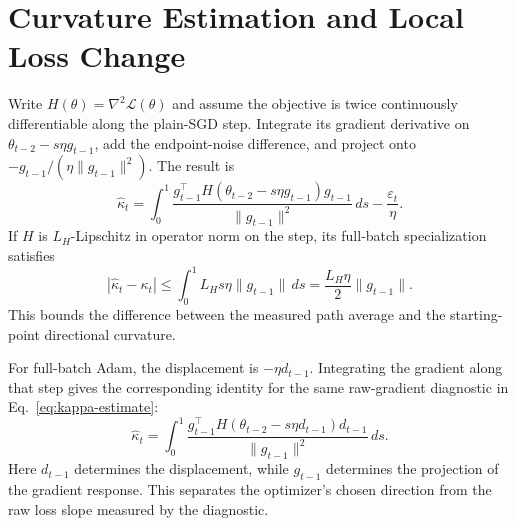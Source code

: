 \section{Curvature Estimation and Local Loss Change}
\label{appendix:loss-curvature}

Write $H(\theta)=\nabla^2\mathcal L(\theta)$ and assume the objective
is twice continuously differentiable along the plain-SGD step.
Integrate its gradient derivative on
$\theta_{t-2}-s\eta g_{t-1}$, add the endpoint-noise difference, and
project onto $-g_{t-1}/(\eta\|g_{t-1}\|^2)$. The result is
\begin{equation}
 \widehat\kappa_t=
 \int_0^1\frac{g_{t-1}^{\top}
 H(\theta_{t-2}-s\eta g_{t-1})g_{t-1}}
 {\|g_{t-1}\|^2}\,ds-\frac{\varepsilon_t}{\eta}.
 \label{eq:path-curvature}
\end{equation}
If $H$ is $L_H$-Lipschitz in operator norm on the step, its
full-batch specialization satisfies
\begin{equation}
 |\widehat\kappa_t-\kappa_t|
 \leq\int_0^1 L_Hs\eta\|g_{t-1}\|\,ds
 =\frac{L_H\eta}{2}\|g_{t-1}\|.
 \label{eq:curvature-error-bound}
\end{equation}
This bounds the difference between the measured path average and the
starting-point directional curvature.

For full-batch Adam, the displacement is $-\eta d_{t-1}$.
Integrating the gradient along that step gives the corresponding identity
for the same raw-gradient diagnostic in Eq.~\eqref{eq:kappa-estimate}:
\begin{equation}
 \widehat\kappa_t=
 \int_0^1\frac{g_{t-1}^{\top}
 H(\theta_{t-2}-s\eta d_{t-1})d_{t-1}}
 {\|g_{t-1}\|^2}\,ds.
 \label{eq:adam-gradient-response}
\end{equation}
Here $d_{t-1}$ determines the displacement, while $g_{t-1}$ determines
the projection of the gradient response. This separates the optimizer's
chosen direction from the raw loss slope measured by the diagnostic.

